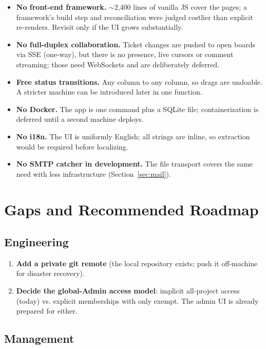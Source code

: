 \documentclass[11pt,a4paper]{article}
\newcommand{\file}[1]{\texttt{\detokenize{#1}}}
\begin{document}
\begin{itemize}
  \item \textbf{No front-end framework.} $\sim$2{,}400 lines of vanilla JS
  cover the pages; a framework's build step and reconciliation were judged
  costlier than explicit re-renders. Revisit only if the UI grows
  substantially.
  \item \textbf{No full-duplex collaboration.} Ticket changes are pushed to
  open boards via SSE (one-way), but there is no presence, live cursors or
  comment streaming; those need WebSockets and are deliberately deferred.
  \item \textbf{Free status transitions.} Any column to any column, so drags
  are undoable. A stricter machine can be introduced later in one function.
  \item \textbf{No Docker.} The app is one \file{npm run dev} command plus a
  SQLite file; containerization is deferred until a second machine deploys.
  \item \textbf{No i18n.} The UI is uniformly English; all strings are
  inline, so extraction would be required before localizing.
  \item \textbf{No SMTP catcher in development.} The file transport covers
  the same need with less infrastructure (Section~\ref{sec:mail}).
\end{itemize}

\section{Gaps and Recommended Roadmap}
\label{sec:gaps}

\subsection{Engineering}

\begin{enumerate}
  \item \textbf{Add a private git remote} (the local repository exists; push
  it off-machine for disaster recovery).
  \item \textbf{Decide the global-Admin access model}: implicit
  all-project access (today) vs. explicit memberships with only
  \file{SUPER_ADMIN} exempt. The admin UI is already prepared for either.
\end{enumerate}

\subsection{Management}
\end{document}
